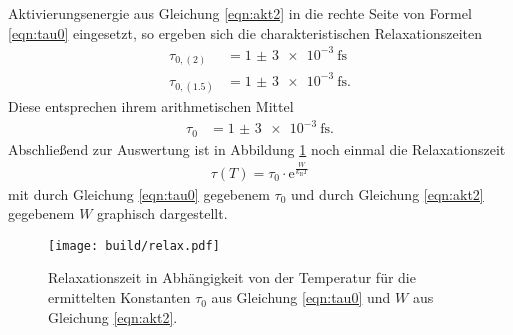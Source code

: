 Aktivierungsenergie aus Gleichung \eqref{eqn:akt2} in die rechte Seite von Formel \eqref{eqn:tau0}
eingesetzt, so ergeben sich die charakteristischen Relaxationszeiten
\begin{align}
  \tau_{0,(2)} &= \SI{1(3)e-3}{\femto\second} \\
  \tau_{0,(1.5)} &= \SI{1(3)e-3}{\femto\second}.
\end{align}
Diese entsprechen ihrem arithmetischen Mittel
\begin{align}
  \tau_0 &= \SI{1(3)e-3}{\femto\second}.
  \label{eqn:tau0}
\end{align}
Abschließend zur Auswertung ist in Abbildung \ref{fig:relaxationszeit} noch einmal die Relaxationszeit
\begin{align}
  \tau(T) = \tau_0 \cdot \mathrm{e}^{\frac{W}{k_\text{B} T}}
\end{align}
mit durch Gleichung \eqref{eqn:tau0} gegebenem $\tau_0$ und durch Gleichung \eqref{eqn:akt2} gegebenem
$W$ graphisch dargestellt.

\begin{figure}
  \centering
  \texttt{[image: build/relax.pdf]}
  \caption{Relaxationszeit in Abhängigkeit von der Temperatur für die ermittelten Konstanten $\tau_0$ aus
  Gleichung \eqref{eqn:tau0} und $W$ aus Gleichung \eqref{eqn:akt2}.}
  \label{fig:relaxationszeit}
\end{figure}
